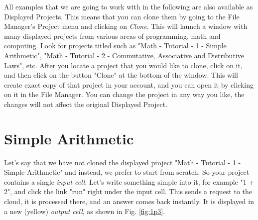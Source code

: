 \documentclass[article,A4,12pt]{llncs}
\begin{document}
All examples that we are going to work with in the following are also available 
as Displayed Projects. This means that you can clone them by going to the
File Manager's Project menu and clicking on {\em Clone}. This will launch 
a window with many displayed projects from various areas of programming,
math and computing. Look for projects titled such as "Math - Tutorial - 1 - Simple Arithmetic",
"Math - Tutorial - 2 - Commutative, Associative and Distributive Laws", etc.
After you locate a project that you would like to clone, click on it,
and then click on the button "Clone" at the bottom of the window. This will
create exact copy of that project in your account, and you can open it 
by clicking on it in the File Manager. You can change the project in any way 
you like, the changes will not affect the original Displayed Project. 

\section{Simple Arithmetic}

Let's say that we have not cloned the displayed project "Math - Tutorial - 1 - Simple Arithmetic"
and instead, we prefer to start from scratch.
So your project contains a single {\em input cell}. Let's write 
something simple into it, for example "1 + 2", and click 
the link "run" right under the input cell. This sends a request to 
the cloud, it is processed there, and an answer comes back instantly. 
It is displayed in a new (yellow) {\em output cell}, as shown in 
Fig. \ref{fig:1p3}.

\newpage
\end{document}
